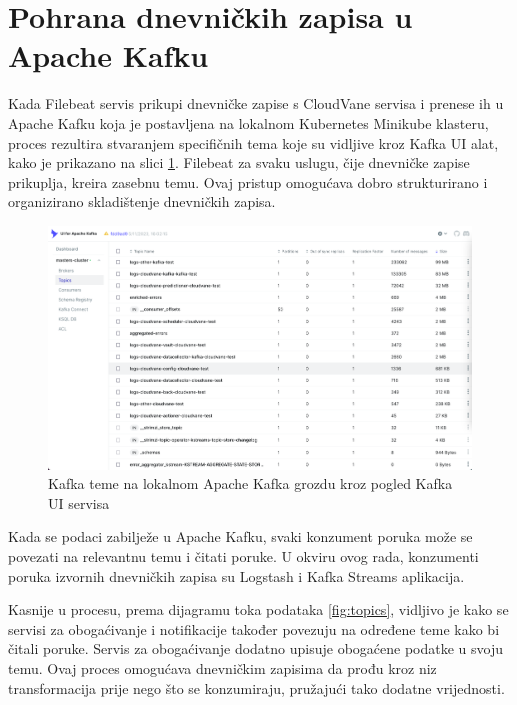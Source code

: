 \documentclass[times, utf8, diplomski]{fer}
\begin{document}
\section{Pohrana dnevničkih zapisa u Apache Kafku}
\label{sec:kafkaImpl}

Kada Filebeat servis prikupi dnevničke zapise s CloudVane servisa i prenese ih u Apache Kafku koja je postavljena na lokalnom Kubernetes Minikube klasteru, proces rezultira stvaranjem specifičnih tema koje su vidljive kroz Kafka UI alat, kako je prikazano na slici \ref{fig:kafkaui}. Filebeat za svaku uslugu, čije dnevničke zapise prikuplja, kreira zasebnu temu. Ovaj pristup omogućava dobro strukturirano i organizirano skladištenje dnevničkih zapisa.\\

\begin{figure}[htb]
	\centering
	\includegraphics[width=15cm]{images/kafka-ui.png}
	\caption[Kafka teme na lokalnom Apache Kafka grozdu kroz pogled Kafka UI servisa]{Kafka teme  na lokalnom Apache Kafka grozdu kroz pogled Kafka UI servisa}
	\label{fig:kafkaui}
\end{figure}

Kada se podaci zabilježe u Apache Kafku, svaki konzument poruka može se povezati na relevantnu temu i čitati poruke. U okviru ovog rada, konzumenti poruka izvornih dnevničkih zapisa su Logstash i Kafka Streams aplikacija.

Kasnije u procesu, prema dijagramu toka podataka \ref{fig:topics}, vidljivo je kako se servisi za obogaćivanje i notifikacije također povezuju na određene teme kako bi čitali poruke. Servis za obogaćivanje dodatno upisuje obogaćene podatke u svoju temu. Ovaj proces omogućava dnevničkim zapisima da prođu kroz niz transformacija prije nego što se konzumiraju, pružajući tako dodatne vrijednosti.\\
\end{document}
